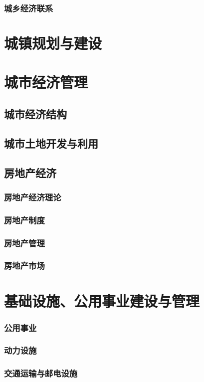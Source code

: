 \documentclass[UTF8]{../../RepresentationUniverse}
\begin{document}
    \subsubsection{城乡经济联系}
\section{城镇规划与建设}
\section{城市经济管理}
    \subsection{城市经济结构}
    \subsection{城市土地开发与利用}
    \subsection{房地产经济}
        \subsubsection{房地产经济理论}
        \subsubsection{房地产制度}
        \subsubsection{房地产管理}
        \subsubsection{房地产市场}
\section{基础设施、公用事业建设与管理}
    \subsubsection{公用事业}
    \subsubsection{动力设施}
    \subsubsection{交通运输与邮电设施}
\end{document}
